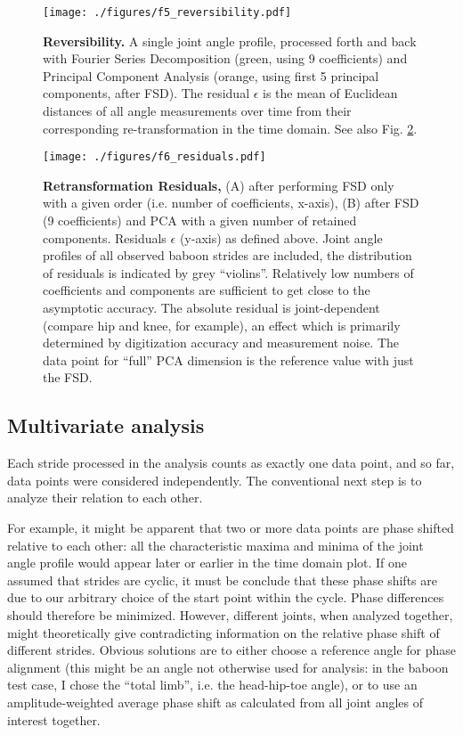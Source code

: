 \begin{figure}[p]
\centering
\texttt{[image: ./figures/f5\_reversibility.pdf]}
\caption{\label{fig:reversibility}\textbf{Reversibility.} A single joint angle profile, processed forth and back with Fourier Series Decomposition (green, using 9 coefficients) and Principal Component Analysis (orange, using first 5 principal components, after FSD). The residual \(\epsilon\) is the mean of Euclidean distances of all angle measurements over time from their corresponding re-transformation in the time domain. See also Fig. \ref{fig:residuals}.}
\end{figure}

\begin{figure}[p]
\centering
\texttt{[image: ./figures/f6\_residuals.pdf]}
\caption{\label{fig:residuals}\textbf{Retransformation Residuals,} (A) after performing FSD only with a given order (i.e. number of coefficients, x-axis), (B) after FSD (9 coefficients) and PCA with a given number of retained components. Residuals \(\epsilon\) (y-axis) as defined above. Joint angle profiles of all observed baboon strides are included, the distribution of residuals is indicated by grey ``violins''. Relatively low numbers of coefficients and components are sufficient to get close to the asymptotic accuracy. The absolute residual is joint-dependent (compare hip and knee, for example), an effect which is primarily determined by digitization accuracy and measurement noise. The data point for ``full'' PCA dimension is the reference value with just the FSD.}
\end{figure}

\subsection{Multivariate analysis}
\label{sec:org2c17156}
Each stride processed in the analysis counts as exactly one data point, and so far, data points were considered independently.
The conventional next step is to analyze their relation to each other.

For example, it might be apparent that two or more data points are phase shifted relative to each other: all the characteristic maxima and minima of the joint angle profile would appear later or earlier in the time domain plot.
If one assumed that strides are cyclic, it must be conclude that these phase shifts are due to our arbitrary choice of the start point within the cycle.
Phase differences should therefore be minimized.
However, different joints, when analyzed together, might theoretically give contradicting information on the relative phase shift of different strides.
Obvious solutions are to either choose a reference angle for phase alignment (this might be an angle not otherwise used for analysis: in the baboon test case, I chose the ``total limb'', i.e. the head-hip-toe angle), or to use an amplitude-weighted average phase shift as calculated from all joint angles of interest together.


